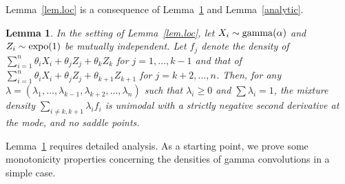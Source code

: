 \documentclass[11pt]{article}
\newtheorem{lemma}{\bf Lemma}
\begin{document}
Lemma~\ref{lem.loc} is a consequence of Lemma~\ref{uni.modal} and Lemma~\ref{analytic}. 
\begin{lemma}
\label{uni.modal}
In the setting of Lemma~\ref{lem.loc}, let $X_i\sim {\rm gamma}(\alpha)$ and $Z_i\sim {\rm expo}(1)$ be mutually independent.  Let $f_j$ denote the density of $\sum_{i=1}^n \theta_i X_i + \theta_j Z_j +\theta_k Z_k$ for $j=1,\ldots, k-1$ and that of
$\sum_{i=1}^n \theta_i X_i + \theta_j Z_j +\theta_{k+1} Z_{k+1}$ for $j=k+2, \ldots, n$. 
Then, for any $\lambda =(\lambda_1, \ldots, \lambda_{k-1}, \lambda_{k+2},\ldots, \lambda_n)$ such that $\lambda_i\geq 0$ and $\sum \lambda_i =1$, the mixture density $\sum_{i\neq k, k+1} \lambda_i f_i $ is unimodal with a strictly negative second derivative at the mode, and no saddle points. 
\end{lemma}

Lemma~\ref{uni.modal} requires detailed analysis.  As a starting point, we prove some monotonicity properties concerning the densities of gamma convolutions in a simple case.  
\end{document}
